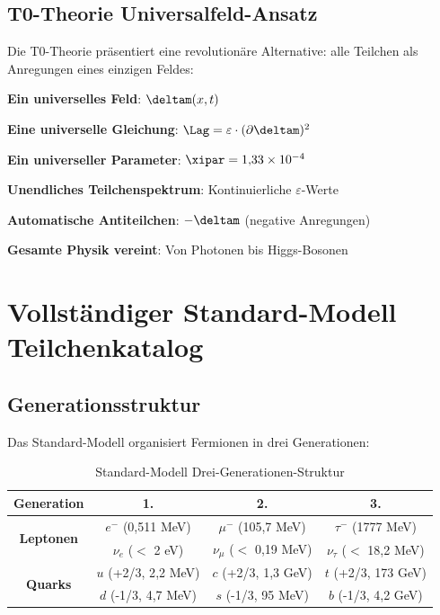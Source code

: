 	\subsection{T0-Theorie Universalfeld-Ansatz}
	
	Die T0-Theorie präsentiert eine revolutionäre Alternative: alle Teilchen als Anregungen eines einzigen Feldes:
	
	\begin{tcolorbox}[colback=blue!5!white,colframe=blue!75!black,title=T0 Universalfeld-Vereinfachung]
		\textbf{Ein universelles Feld}: $\deltam(x,t)$
		
		\textbf{Eine universelle Gleichung}: $\Lag = \varepsilon \cdot (\partial \deltam)^2$
		
		\textbf{Ein universeller Parameter}: $\xipar = 1{,}33 \times 10^{-4}$
		
		\textbf{Unendliches Teilchenspektrum}: Kontinuierliche $\varepsilon$-Werte
		
		\textbf{Automatische Antiteilchen}: $-\deltam$ (negative Anregungen)
		
		\textbf{Gesamte Physik vereint}: Von Photonen bis Higgs-Bosonen
	\end{tcolorbox}
	
	\section{Vollständiger Standard-Modell Teilchenkatalog}
	
	\subsection{Generationsstruktur}
	
	Das Standard-Modell organisiert Fermionen in drei Generationen:
	
	\begin{table}[htbp]
		\centering
		\begin{tabular}{|c|c|c|c|}
			\hline
			\textbf{Generation} & \textbf{1.} & \textbf{2.} & \textbf{3.} \\
			\hline
			\hline
			\multirow{2}{*}{\textbf{Leptonen}} & $e^-$ (0{,}511 MeV) & $\mu^-$ (105{,}7 MeV) & $\tau^-$ (1777 MeV) \\
			& $\nu_e$ ($<$ 2 eV) & $\nu_\mu$ ($<$ 0{,}19 MeV) & $\nu_\tau$ ($<$ 18{,}2 MeV) \\
			\hline
			\multirow{2}{*}{\textbf{Quarks}} & $u$ (+2/3, 2{,}2 MeV) & $c$ (+2/3, 1{,}3 GeV) & $t$ (+2/3, 173 GeV) \\
			& $d$ (-1/3, 4{,}7 MeV) & $s$ (-1/3, 95 MeV) & $b$ (-1/3, 4{,}2 GeV) \\
			\hline
		\end{tabular}
		\caption{Standard-Modell Drei-Generationen-Struktur}
		\label{tab:sm_generations}
	\end{table}
	
